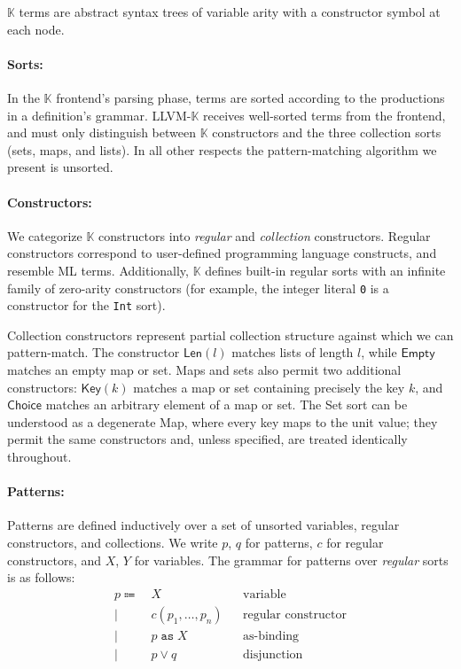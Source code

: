 \documentclass{article}
\theoremstyle{definition}
\newcommand{\K}{$\mathbb{K}$\xspace}
\newcommand{\KL}{LLVM-\K}
\newcommand{\listcst}{\mathsf{Len}}
\newcommand{\emptymap}{\mathsf{Empty}}
\newcommand{\mapkey}{\mathsf{Key}}
\newcommand{\mapchoice}{\mathsf{Choice}}
\begin{document}
\K terms are abstract syntax trees of variable arity with a constructor symbol
at each node.

\paragraph{Sorts:}

In the \K frontend's parsing phase, terms are sorted according to the
productions in a definition's grammar. \KL receives well-sorted terms from the
frontend, and must only distinguish between \K constructors and the three
collection sorts (sets, maps, and lists). In all other respects the
pattern-matching algorithm we present is unsorted.

\paragraph{Constructors:}

We categorize \K constructors into \emph{regular} and \emph{collection}
constructors. Regular constructors correspond to user-defined programming
language constructs, and resemble ML terms. Additionally, \K defines built-in
regular sorts with an infinite family of zero-arity constructors (for example,
the integer literal \texttt{0} is a constructor for the
\texttt{Int} sort).

Collection constructors represent partial collection structure against which we
can pattern-match. The constructor $ \listcst(l) $ matches lists of
length $ l $, while $ \emptymap $ matches an empty map or set. Maps and sets also
permit two additional constructors: $ \mapkey(k) $ matches a map or set
containing precisely the key $ k $, and $ \mapchoice $ matches an arbitrary
element of a map or set. The Set sort can be understood as a degenerate Map,
where every key maps to the unit value; they permit the same constructors and,
unless specified, are treated identically throughout.


\paragraph{Patterns:} \label{sec:pattern-grammar}

Patterns are defined inductively over a set of unsorted variables, regular
constructors, and collections. We write $p$, $q$ for patterns, $ c $ for regular
constructors, and $ X $, $ Y $ for variables. The grammar for patterns over
\emph{regular} sorts is as follows:
\begin{align*}
  p \Coloneqq & \: X                        && \text{variable} \\
    \mid      & \: c(p_1, \dots, p_n)       && \text{regular constructor} \\
    \mid      & \: p \; \mathtt{as} \; X    && \text{as-binding} \\
    \mid      & \: p \lor q                 && \text{disjunction}
\end{align*}
\end{document}
